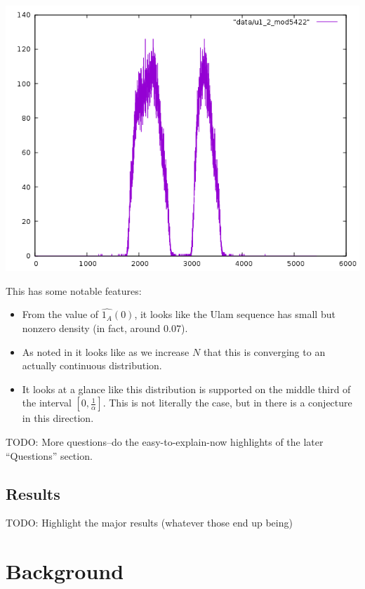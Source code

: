 \documentclass{article}
\theoremstyle{definition}
\theoremstyle{remark}
\numberwithin{equation}{section}
\begin{document}
\includegraphics[scale=0.5]{../figs/u1_2_mod5422.png}

This has some notable features: 

\begin{itemize}
\item From the value of $\widehat{1_A}(0)$, it looks like the Ulam
  sequence has small but nonzero density (in fact, around $0.07$).

\item As noted in \cite{ulam_steinerberger} it looks like as we increase $N$
  that this is converging to an actually continuous distribution.

\item It looks at a glance like this distribution is supported on the
  middle third of the interval $[0,\frac1\alpha]$.  This is not
  literally the case, but in \cite{avoid_zero_gibbs} there is a
  conjecture in this direction.

\end{itemize}

{\color{red}

TODO: More questions--do the easy-to-explain-now highlights of the
later ``Questions'' section.

\subsection{Results}

TODO: Highlight the major results (whatever those end up being)

}
\section{Background}
\end{document}
